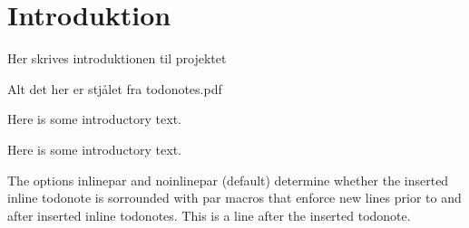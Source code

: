\chapter{Introduktion}\label{ch:introduktion}
Her skrives introduktionen til projektet\cite{Bilal}

Alt det her er stjålet fra todonotes.pdf

\vspace{2cm}

Here is some introductory text.

\vspace{2cm}

Here is some introductory text.


\vspace{2cm}


The options inlinepar and noinlinepar (default) determine whether the
inserted inline todonote is sorrounded with par macros that enforce new lines
prior to and after inserted inline todonotes.  This
is a line after the inserted todonote.

\clearpage

\listoftodos



